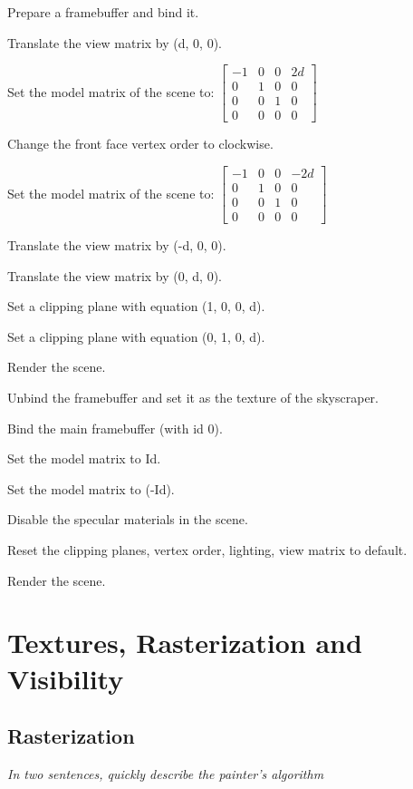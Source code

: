 \documentclass[a4paper,10pt]{article}
\newcommand{\cmark}{\ding{51}}%
\newcommand{\done}{\rlap{$\square$}{\raisebox{2pt}{\large\hspace{1pt}\cmark}}%
	\hspace{-2.5pt}}
\begin{document}
\begin{todolist}
	\item[\done] Prepare a framebuffer and bind it.
	\item Translate the view matrix by (d, 0, 0).
	\item Set the model matrix of the scene to: $\begin{bmatrix}
	-1 & 0 & 0 & 2d\\
	0 & 1 & 0 & 0\\
	0 & 0 & 1 & 0\\
	0 & 0 & 0 & 0
	\end{bmatrix}$
	\item[\done] Change the front face vertex order to clockwise.
	\item[\done] Set the model matrix of the scene to: $\begin{bmatrix}
	-1 & 0 & 0 & -2d\\
	0 & 1 & 0 & 0\\
	0 & 0 & 1 & 0\\
	0 & 0 & 0 & 0
	\end{bmatrix}$
	\item[\done] Translate the view matrix by (-d, 0, 0).
	\item Translate the view matrix by (0, d, 0).
	\item Set a clipping plane with equation (1, 0, 0, d).
	\item[\done] Set a clipping plane with equation (0, 1, 0, d).
	\item[\done] Render the scene.
	\item[\done] Unbind the framebuffer and set it as the texture of the skyscraper.
	\item[\done] Bind the main framebuffer (with id 0).
	\item[\done] Set the model matrix to Id.
	\item Set the model matrix to (-Id).
	\item[\done] Disable the specular materials in the scene.
	\item[\done] Reset the clipping planes, vertex order, lighting, view matrix to default. 
	\item[\done] Render the scene.
\end{todolist}

\section{Textures, Rasterization and Visibility}
\subsection{Rasterization}
\textit{In two sentences, quickly describe the painter's algorithm}\\
\end{document}
